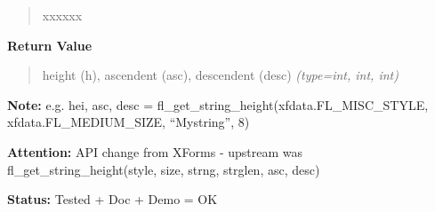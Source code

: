 \begin{boxedminipage}{\funcwidth}
\begin{quote}
\begin{Ventry}{xxxxxx}
        \end{Ventry}

      \end{quote}

      \textbf{Return Value}
    \vspace{-1ex}

      \begin{quote}

height (h), ascendent (asc), descendent (desc)
      {\it (type=int, int, int)}

      \end{quote}

\textbf{Note:} 
e.g. hei, asc, desc = fl\_get\_string\_height(xfdata.FL\_MISC\_STYLE,
xfdata.FL\_MEDIUM\_SIZE, ``Mystring'', 8)


\textbf{Attention:} 
API change from XForms - upstream was
fl\_get\_string\_height(style, size, strng, strglen, asc, desc)


\textbf{Status:} 
Tested + Doc + Demo = OK


    \end{boxedminipage}

    \label{xformslib:flbasic:fl_get_string_width}

    \vspace{0.5ex}

